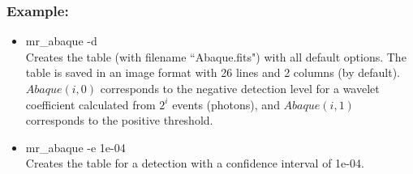 \begin{itemize}
\subsubsection*{Example:}
\begin{itemize}
\item mr\_abaque -d \\
Creates the table (with filename ``Abaque.fits") with all default options.
The table is saved in an image format with 26 lines and 2 columns (by default).
$Abaque(i,0)$ corresponds to the negative detection level for a wavelet 
coefficient calculated from $2^i$ events  (photons), and $Abaque(i,1)$ corresponds to the positive threshold.
\item mr\_abaque -e 1e-04 \\
Creates the table for a detection with a confidence interval of 1e-04. 
\end{itemize}




\end{itemize}
